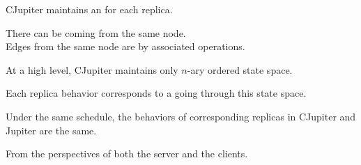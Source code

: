 
\begin{frame}{}
  \centerline{\Huge {}}
\end{frame}

\begin{frame}{}
  \begin{center}
    {\large CJupiter maintains an  for each replica.}
  \end{center}


  \begin{center} 
    There can be  coming from the same node. \\[5pt]
    Edges from the same node are  by associated operations.
  \end{center}
\end{frame}

\begin{frame}{}
  \begin{center}
    \begin{prop}
      {\large At a high level, CJupiter maintains only  $n$-ary ordered state space.}
    \end{prop}

    \vspace{0.20cm}

    \vspace{0.20cm}
    Each replica behavior corresponds to a  going through this state space.
  \end{center}
\end{frame}

\begin{frame}{}
  \begin{Theorem}
    Under the same schedule, the behaviors of corresponding replicas in CJupiter and Jupiter are the same.
  \end{Theorem}

  \vspace{1.0cm}
  \centerline{\large From the perspectives of both the server and the clients.}
\end{frame}
